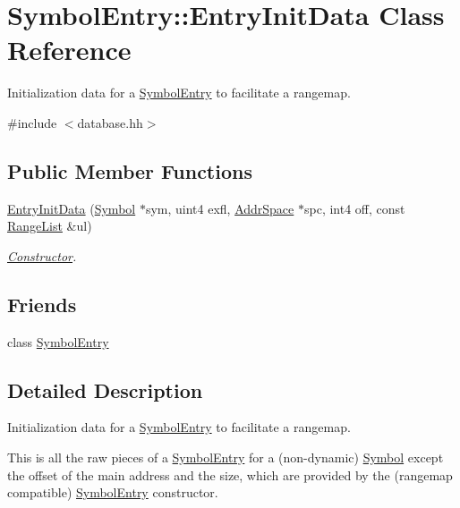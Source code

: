 \hypertarget{class_symbol_entry_1_1_entry_init_data}{}\section{Symbol\+Entry\+::Entry\+Init\+Data Class Reference}
\label{class_symbol_entry_1_1_entry_init_data}


Initialization data for a \mbox{\hyperlink{class_symbol_entry}{Symbol\+Entry}} to facilitate a rangemap.  




{\ttfamily \#include $<$database.\+hh$>$}

\subsection*{Public Member Functions}
\begin{DoxyCompactItemize}
\item 
\mbox{\hyperlink{class_symbol_entry_1_1_entry_init_data_aefec5777eddf06f9add2823bce0bc561}{Entry\+Init\+Data}} (\mbox{\hyperlink{class_symbol}{Symbol}} $\ast$sym, uint4 exfl, \mbox{\hyperlink{class_addr_space}{Addr\+Space}} $\ast$spc, int4 off, const \mbox{\hyperlink{class_range_list}{Range\+List}} \&ul)
\begin{DoxyCompactList}\small\item\em \mbox{\hyperlink{class_constructor}{Constructor}}. \end{DoxyCompactList}\end{DoxyCompactItemize}
\subsection*{Friends}
\begin{DoxyCompactItemize}
\item 
class \mbox{\hyperlink{class_symbol_entry_1_1_entry_init_data_a66ab73b76c4868b7a9981390ad794dbc}{Symbol\+Entry}}
\end{DoxyCompactItemize}


\subsection{Detailed Description}
Initialization data for a \mbox{\hyperlink{class_symbol_entry}{Symbol\+Entry}} to facilitate a rangemap. 

This is all the raw pieces of a \mbox{\hyperlink{class_symbol_entry}{Symbol\+Entry}} for a (non-\/dynamic) \mbox{\hyperlink{class_symbol}{Symbol}} except the offset of the main address and the size, which are provided by the (rangemap compatible) \mbox{\hyperlink{class_symbol_entry}{Symbol\+Entry}} constructor. 

